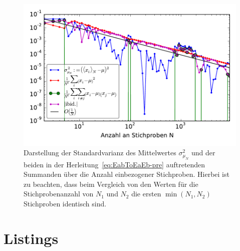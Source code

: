 \documentclass[german,bibnum,beleg,zihtitle,german,hyperref,utf8]{zihpub}
\begin{document}
\begin{figure}[H]
	\centering
	\begin{minipage}{0.7\linewidth}
		\includegraphics[width=\linewidth]{meanerror.pdf}
	\end{minipage}
	\caption{Darstellung der Standardvarianz des Mittelwertes $\sigma_{\mu_N}^2$ und der beiden in der Herleitung~\ref{eq:EabToEaEb-pre} auftretenden Summanden über die Anzahl einbezogener Stichproben. Hierbei ist zu beachten, dass beim Vergleich von den Werten für die Stichprobenanzahl von $N_1$ und $N_2$ die ersten $\min\left( N_1,N_2 \right)$ Stichproben identisch sind.}
	\label{fig:meanerrorsummand}
\end{figure}



\chapter{Listings}





\end{document}
